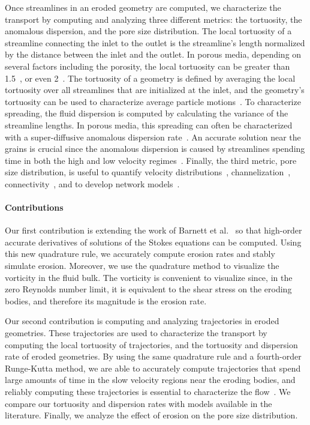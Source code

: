 \documentclass[preprint,10pt]{elsarticle}
\begin{document}
Once streamlines in an eroded geometry are computed, we characterize the
transport by computing and analyzing three different metrics: the
tortuosity, the anomalous dispersion, and the pore size distribution.
The local tortuosity of a streamline connecting the inlet to the outlet
is the streamline's length normalized by the distance between the inlet
and the outlet.  In porous media, depending on several factors including
the porosity, the local tortuosity can be greater than
1.5~\cite{kop-kat-tim1996, mat-kha-koz2008}, or even
2~\cite{dud-koz-mat2011}.  The tortuosity of a geometry is defined by
averaging the local tortuosity over all streamlines that are initialized
at the inlet, and the geometry's tortuosity can be used to characterize
average particle motions~\cite{hak-com-den2019}.  To characterize
spreading, the fluid dispersion is computed by calculating the variance
of the streamline lengths. In porous media, this spreading can often be
characterized with a super-diffusive anomalous dispersion
rate~\cite{kan-dea-nun-bij-blu-jua2014, cus-hu-den1995,
dea-leb-den-tar-bol-dav2013}. An accurate solution near the grains is
crucial since the anomalous dispersion is caused by streamlines spending
time in both the high and low velocity regimes~\cite{ber-sch2001}.
Finally, the third metric, pore size distribution, is useful to quantify
velocity distributions~\cite{ali-par-wei-bre2017, dea-qua-bir-jua2018},
channelization~\cite{sie-ili-pri-riv-gua2019},
connectivity~\cite{knu-car2005, wes-blo-gra2001}, and to develop network
models~\cite{bry-kin-mel1993, bry-mel-cad1993, bij-blu2006}.

\paragraph{Contributions}
Our first contribution is extending the work of Barnett et
al.~\cite{bar-wu-vee2015} so that high-order accurate derivatives of
solutions of the Stokes equations can be computed.  Using this new
quadrature rule, we accurately compute erosion rates and stably simulate
erosion.  Moreover, we use the quadrature method to visualize the
vorticity in the fluid bulk.  The vorticity is convenient to visualize
since, in the zero Reynolds number limit, it is equivalent to the shear
stress on the eroding bodies, and therefore its magnitude is the erosion
rate.

Our second contribution is computing and analyzing trajectories in
eroded geometries.  These trajectories are used to characterize the
transport by computing the local tortuosity of trajectories, and the
tortuosity and dispersion rate of eroded geometries. By using the same
quadrature rule and a fourth-order Runge-Kutta method, we are able to
accurately compute trajectories that spend large amounts of time in the
slow velocity regions near the eroding bodies, and reliably computing
these trajectories is essential to characterize the
flow~\cite{dea-leb-den-tar-bol-dav2013}.  We compare our tortuosity and
dispersion rates with models available in the literature.  Finally, we
analyze the effect of erosion on the pore size distribution.
\end{document}

